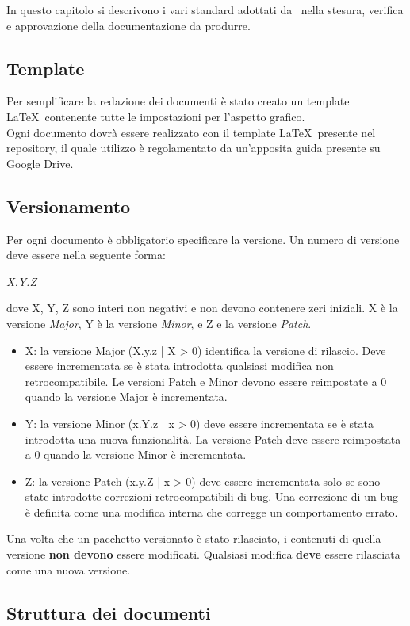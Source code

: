In questo capitolo si descrivono i vari standard adottati da \GRUPPO\ nella stesura, verifica e approvazione della documentazione da produrre.
\subsection{Template}
Per semplificare la redazione dei documenti è stato creato un template \LaTeX\ contenente tutte le impostazioni per l'aspetto grafico. \\
Ogni documento dovrà essere realizzato con il template \LaTeX\ presente nel repository, il quale utilizzo è regolamentato da un'apposita guida presente su Google Drive.
\subsection{Versionamento}
Per ogni documento è obbligatorio specificare la versione. Un numero di versione deve essere nella seguente forma:
\begin{center}
	\emph{X.Y.Z}
\end{center}
dove X, Y, Z sono interi non negativi e non devono contenere zeri iniziali. X è la versione \textit{Major}, Y è la versione \textit{Minor}, e Z e la versione \textit{Patch}.
\begin{itemize}
	\item X: la versione Major (X.y.z | X > 0) identifica la versione di rilascio. Deve essere incrementata se è stata introdotta qualsiasi modifica non retrocompatibile. Le versioni Patch e Minor devono essere reimpostate a 0 quando la versione Major è incrementata. 
	\item Y: la versione Minor (x.Y.z | x > 0) deve essere incrementata se è stata introdotta una nuova funzionalità. La versione Patch deve essere reimpostata a 0 quando la versione Minor è incrementata.
	\item Z: la versione Patch (x.y.Z | x > 0) deve essere incrementata solo se sono state introdotte correzioni retrocompatibili di bug. Una correzione di un bug è definita come una modifica interna che corregge un comportamento errato.
\end{itemize}
Una volta che un pacchetto versionato è stato rilasciato, i contenuti di quella versione \textbf{non devono} essere modificati. Qualsiasi modifica \textbf{deve} essere rilasciata come una nuova versione.

\subsection{Struttura dei documenti}
